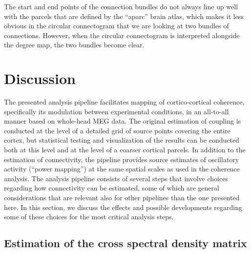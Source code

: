 \documentclass[utf8]{frontiersSCNS}
\begin{document}
The start and end points of the connection bundles do not always line up well with the parcels that are defined by the ``aparc'' brain atlas, which makes it less obvious in the circular connectogram that we are looking at two bundles of connections.
However, when the circular connectogram is interpreted alongside the degree map, the two bundles become clear.


\section{Discussion}\label{discussion}

The presented analysis pipeline facilitates mapping of cortico-cortical coherence, specifically its modulation between experimental conditions, in an all-to-all manner based on whole-head MEG data.
The original estimation of coupling is conducted at the level of a detailed grid of source points covering the entire cortex, but statistical testing and visualization of the results can be conducted both at this level and at the level of a coarser cortical parcels.
In addition to the estimation of connectivity, the pipeline provides source estimates of oscillatory activity (``power mapping'') at the same spatial scales as used in the coherence analysis.
The analysis pipeline consists of several steps that involve choices regarding how connectivity can be estimated, some of which are general considerations that are relevant also for other pipelines than the one presented here.
In this section, we discuss the effects and possible developments regarding some of these choices for the most critical analysis steps.

\subsection{Estimation of the cross spectral density matrix}
\end{document}
